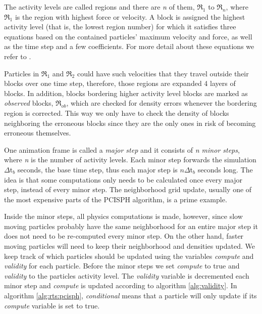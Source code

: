\documentclass[../../main.tex]{subfiles}
\begin{document}
The activity levels are called regions and there are \textit{n} of them, $\Re_1$ to $\Re_n$, where $\Re_1$ is the region with highest force or velocity. A block is assigned the highest activity level (that is, the lowest region number) for which it satisfies three equations based on the contained particles' maximum velocity and force, as well as the time step and a few coefficients. For more detail about these equations we refer to \citet{goswami2014regional}.

Particles in $\Re_1$ and $\Re_2$ could have such velocities that they travel outside their blocks over one time step, therefore, those regions are expanded 4 layers of blocks. 
In addition, blocks bordering higher activity level blocks are marked as \textit{observed} blocks, $\Re_{ob}$, which are checked for density errors whenever the bordering region is corrected. This way we only have to check the density of blocks neighboring the erroneous blocks since they are the only ones in risk of becoming erroneous themselves. 

One animation frame is called a \textit{major step} and it consists of \textit{n minor steps}, where \textit{n} is the number of activity levels. Each minor step forwards the simulation $\Delta$t$_b$ seconds, the base time step, thus each major step is $n\Delta$t$_b$ seconds long. The idea is that some computations only needs to be calculated once every major step, instead of every minor step. The neighborhood grid update, usually one of the most expensive parts of the PCISPH algorithm, is a prime example. 

Inside the minor steps, all physics computations is made, however, since slow moving particles probably have the same neighborhood for an entire major step it does not need to be re-computed every minor step. On the other hand, faster moving particles will need to keep their neighborhood and densities updated. We keep track of which particles should be updated using the variables \textit{compute} and \textit{validity} for each particle. Before the minor steps we set \textit{compute} to true and \textit{validity} to the particles activity level. The \textit{validity} variable is decremented each minor step and \textit{compute} is updated according to algorithm \ref{alg:validity}. In algorithm \ref{alg:rts:pcisph}, \textit{conditional} means that a particle will only update if its \textit{compute} variable is set to true. 
\end{document}
